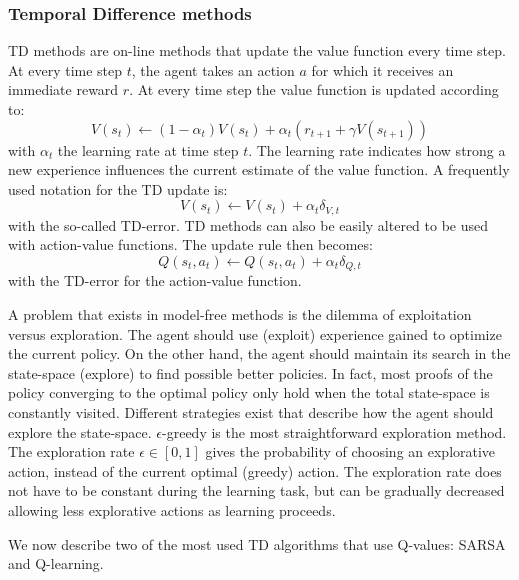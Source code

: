 \subsubsection{Temporal Difference methods}\label{sec:RL-TD_methods}
\ac{TD} methods are on-line methods that update the value function every time step. At every time step $t$, the agent takes an action $a$ for which it receives an immediate reward $r$. At every time step the value function is updated according to:
$$%
		V(s_t) \leftarrow (1-\alpha_t)V(s_t) + \alpha_t \left( r_{t+1} + \gamma V(s_{t+1}) \right)
$$%
with $\alpha_t$ the learning rate at time step $t$. The learning rate indicates how strong a new experience influences the current estimate of the value function. A frequently used notation for the \ac{TD} update is: 
\begin{equation}\label{eqn:RL-TDbasicV}
		V(s_t) \leftarrow V(s_t) + \alpha_t \delta_{V,t}
\end{equation}
with  the so-called TD-error. \ac{TD} methods can also be easily altered to be used with action-value functions. The update rule then becomes:
\begin{equation}\label{eqn:RL-TDbasicQ}
	Q(s_t,a_t) \leftarrow Q(s_t,a_t) + \alpha_t \delta_{Q,t}
\end{equation}
with  the TD-error for the action-value function.

A problem that exists in model-free methods is the dilemma of exploitation versus exploration. The agent should use (exploit) experience gained to optimize the current policy. On the other hand, the agent should maintain its search in the state-space (explore) to find possible better policies. In fact, most proofs of the policy converging to the optimal policy only hold when the total state-space is constantly visited. Different strategies exist that describe how the agent should explore the state-space. $\epsilon$-greedy is the most straightforward exploration method. The exploration rate $\epsilon \in [0,1]$ gives the probability of choosing an explorative action, instead of the current optimal (greedy) action. The exploration rate does not have to be constant during the learning task, but can be gradually decreased allowing less explorative actions as learning proceeds.

We now describe two of the most used \ac{TD} algorithms that use Q-values: SARSA and Q-learning.

